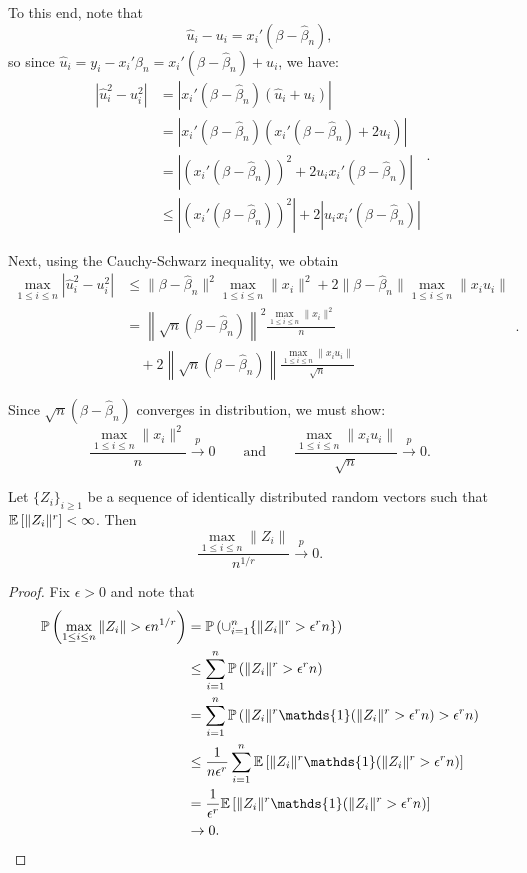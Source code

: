 \begin{remark}
	To this end, note that \[
		\hat{u}_i - u_i = x_i' (\beta - \hat{\beta}_n)
	,\] so since $\hat{u}_i = y_i - x_i' \hat{\beta}_n = x_i' (\beta - \hat{\beta}_n) + u_i$, we have: \[
		\begin{aligned}
			|\hat{u}_i^2 - u_i^2|
			&= |x_i' (\beta - \hat{\beta}_n) (\hat{u}_i + u_i)| \\
			&= |x_i' (\beta - \hat{\beta}_n) (x_i' (\beta - \hat{\beta}_n) + 2u_i)| \\
			&= \left| \left( x_i' (\beta - \hat{\beta}_n) \right)^2 + 2u_i x_i' (\beta - \hat{\beta}_n) \right| \\
			&\le \left| \left( x_i' (\beta - \hat{\beta}_n) \right)^2 \right| + 2 \left| u_i x_i' (\beta - \hat{\beta}_n) \right|
		\end{aligned}
	.\] 

	Next, using the Cauchy-Schwarz inequality, we obtain \[
		\begin{aligned}
			\max_{1 \le i \le n} |\hat{u}_i^2 - u_i^2|
			&\le \|\beta - \hat{\beta}_n\|^2 \max_{1 \le i \le n} \|x_i\|^2 + 2 \|\beta - \hat{\beta}_n\| \max_{1 \le i \le n} \|x_i u_i\| \\
			&= \left\| \sqrt{n} (\beta - \hat{\beta}_n) \right\|^2 \frac{\max_{1 \le i \le n} \|x_i\|^2}{n} \\
			&\quad + 2 \left\| \sqrt{n} (\beta - \hat{\beta}_n) \right\| \frac{\max_{1 \le i \le n} \|x_i u_i\|}{\sqrt{n}}
		\end{aligned}
	.\] 

	Since $\sqrt{n} (\beta - \hat{\beta}_n)$ converges in distribution, we must show: \[
		\frac{\max_{1 \le i \le n} \|x_i\|^2}{n} \xrightarrow{p} 0
		\qquad \text{and} \qquad
		\frac{\max_{1 \le i \le n} \|x_i u_i\|}{\sqrt{n}} \xrightarrow{p} 0
	.\] 
\end{remark}

\begin{lemma}	Let $\{Z_i\}_{i \ge 1}$ be a sequence of identically distributed random vectors such that $\mathbb{E}\left[\|Z_i\|^r\right] < \infty$. Then \[
		\frac{\max_{1 \le i \le n} \|Z_i\|}{n^{1/r}} \xrightarrow{p} 0
	.\] 
\end{lemma}

\begin{proof}
	Fix $\epsilon > 0$ and note that
	\begin{align*}
		\P\left( \max_{1 \le i \le n} \|Z_i\| > \epsilon n^{1/r} \right) &= \P\left( \cup_{i=1}^n \{\|Z_i\|^r > \epsilon^r n\} \right) \\
		&\le \sum_{i=1}^{n} \P\left( \|Z_i\|^r > \epsilon^r n \right) \\
		&= \sum_{i=1}^{n} \P\left( \|Z_i\|^r \mathds{1}(\|Z_i\|^r > \epsilon^r n) > \epsilon^r n \right) \\
		&\le \frac{1}{n\epsilon^r} \sum_{i=1}^{n} \E\left[\|Z_i\|^r \mathds{1}(\|Z_i\|^r > \epsilon^r n)\right] \\
		&= \frac{1}{\epsilon^r} \E\left[\|Z_i\|^r \mathds{1}(\|Z_i\|^r > \epsilon^r n)\right] \\
		&\to 0
	.\end{align*}
\end{proof}

